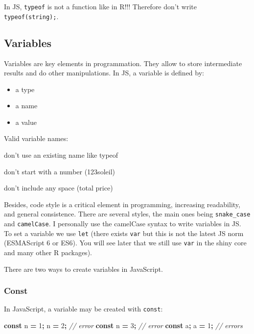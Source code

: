 \documentclass[
]{book}
\newenvironment{Shaded}{\begin{snugshade}}{\end{snugshade}}
\newcommand{\CommentTok}[1]{\textcolor[rgb]{0.56,0.35,0.01}{\textit{#1}}}
\newcommand{\DecValTok}[1]{\textcolor[rgb]{0.00,0.00,0.81}{#1}}
\newcommand{\KeywordTok}[1]{\textcolor[rgb]{0.13,0.29,0.53}{\textbf{#1}}}
\newcommand{\NormalTok}[1]{#1}
\newcommand{\OperatorTok}[1]{\textcolor[rgb]{0.81,0.36,0.00}{\textbf{#1}}}
\providecommand{\tightlist}{%
  \setlength{\itemsep}{0pt}\setlength{\parskip}{0pt}}
\begin{document}
In JS, \texttt{typeof} is not a function like in R!!! Therefore don't write \texttt{typeof(\textquotesingle{}string\textquotesingle{});}.

\hypertarget{variables}{%
\subsection{Variables}\label{variables}}

Variables are key elements in programmation. They allow to store intermediate results and do other manipulations. In JS, a variable is defined by:

\begin{itemize}
\tightlist
\item
  a type
\item
  a name
\item
  a value
\end{itemize}

Valid variable names:

don't use an existing name like typeof

don't start with a number (123soleil)

don't include any space (total price)

Besides, code style is a critical element in programming, increasing readability, and general consistence. There are several styles, the main ones being \texttt{snake\_case} and \texttt{camelCase}. I personally use the camelCase syntax to write variables in JS. To set a variable we use \texttt{let} (there exists \texttt{var} but this is not the latest JS norm (ESMAScript 6 or ES6). You will see later that we still use \texttt{var} in the shiny core and many other R packages).

There are two ways to create variables in JavaScript.

\hypertarget{const}{%
\subsubsection{Const}\label{const}}

In JavaScript, a variable may be created with \texttt{const}:

\begin{Shaded}
\begin{Highlighting}[]
\KeywordTok{const}\NormalTok{ n }\OperatorTok{=} \DecValTok{1}\OperatorTok{;}
\NormalTok{n }\OperatorTok{=} \DecValTok{2}\OperatorTok{;} \CommentTok{// error}
\KeywordTok{const}\NormalTok{ n }\OperatorTok{=} \DecValTok{3}\OperatorTok{;} \CommentTok{// error}
\KeywordTok{const}\NormalTok{ a}\OperatorTok{;}
\NormalTok{a }\OperatorTok{=} \DecValTok{1}\OperatorTok{;} \CommentTok{// errors}
\end{Highlighting}
\end{Shaded}
\end{document}
